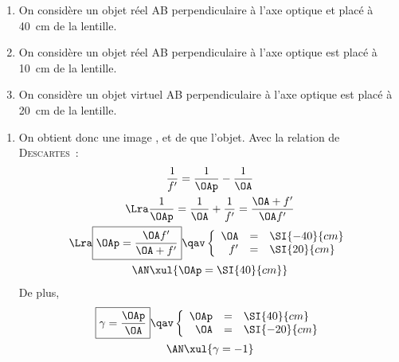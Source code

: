 \documentclass[a4paper, 11pt, garamond, oneside]{book}
\begin{document}
{	\begin{enumerate}
		\item On considère un objet réel AB perpendiculaire à l'axe optique et placé
		      à \SI{40}{cm} de la lentille.
		\item On considère un objet réel AB perpendiculaire à l'axe optique est
		      placé à \SI{10}{cm} de la lentille.
		\item On considère un objet virtuel AB perpendiculaire à l'axe optique est
		      placé à \SI{20}{cm} de la lentille.
	\end{enumerate}
}{
	\begin{enumerate}
		\item
		      \noindent
		      \begin{minipage}[t]{.48\linewidth}
			      On obtient donc une image ,  et de
			       que l'objet. Avec la relation de
			      \textsc{Descartes}~:
			      \begin{gather*}
				      \frac{1}{f'} =  \frac{1}{\OAp}-\frac{1}{\OA}
				      \\\Lra
				      \frac{1}{\OAp} = \frac{1}{\OA}+\frac{1}{f'}= \frac{\OA+f'}{\OA f'}
				      \\\Lra
				      \boxed{\OAp = \frac{\OA f'}{\OA+f'}}
				      \qav
				      \left\{
				      \begin{array}{rcl}
					      \OA & = & \SI{-40}{cm}
					      \\
					      f'  & = & \SI{20}{cm}
				      \end{array}
				      \right.\\
				      \AN
				      \xul{
					      \OAp = \SI{40}{cm}
				      }
			      \end{gather*}
			      De plus,
			      \begin{gather*}
				      \boxed{\gamma = \frac{\OAp}{\OA}}
				      \qav
				      \left\{
				      \begin{array}{rcl}
					      \OAp & = & \SI{40}{cm}
					      \\
					      \OA  & = & \SI{-20}{cm}
				      \end{array}
				      \right.\\
				      \AN
				      \xul{
					      \gamma = -1
				      }
			      \end{gather*}
		      \end{minipage}
		      \hfill
		      \begin{minipage}[t]{.48\linewidth}
			      ~
			      \begin{center}

\end{center}
\end{minipage}
\end{enumerate}}
\end{document}
